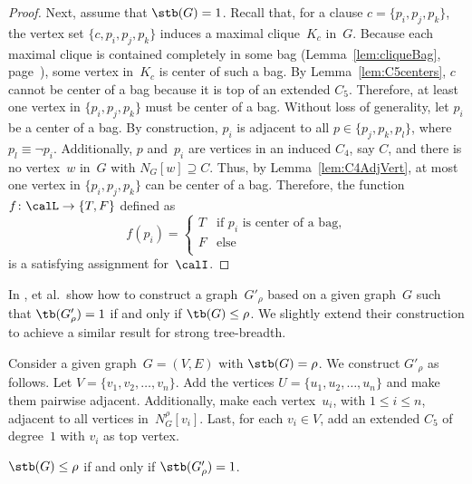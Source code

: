 \begin{proof}
Next, assume that $\stb(G) = 1$.
Recall that, for a clause $c = \{ p_i, p_j, p_k \}$, the vertex set $\{ c, p_i, p_j, p_k \}$ induces a maximal clique~$K_c$ in~$G$.
Because each maximal clique is contained completely in some bag (Lemma~\ref{lem:cliqueBag}, page~\pageref{lem:cliqueBag}), some vertex in~$K_c$ is center of such a bag.
By Lemma~\ref{lem:C5centers}, $c$ cannot be center of a bag because it is top of an extended $C_5$.
Therefore, at least one vertex in $\{ p_i, p_j, p_k \}$ must be center of a bag.
Without loss of generality, let $p_i$ be a center of a bag.
By construction, $p_i$ is adjacent to all $p \in \{ p_j, p_k, p_l \}$, where $p_l \equiv \neg p_i$.
Additionally, $p$ and~$p_i$ are vertices in an induced $C_4$, say $C$, and there is no vertex~$w$ in~$G$ with $N_G[w] \supseteq C$.
Thus, by Lemma~\ref{lem:C4AdjVert}, at most one vertex in $\{ p_i, p_j, p_k \}$ can be center of a bag.
Therefore, the function $f \colon \calL \rightarrow \{ T, F \}$ defined as
\[
    f(p_i) =
        \begin{cases}
            T & \text{if $p_i$ is center of a bag,} \\
            F & \text{else} \\
        \end{cases}
\]
is a satisfying assignment for~$\calI$.
\end{proof}

In \cite{DucoLegaNiss2016},  et al.\ show how to construct a graph~$G'_\rho$ based on a given graph~$G$ such that $\tb(G'_\rho) = 1$ if and only if $\tb(G) \leq \rho$.
We slightly extend their construction to achieve a similar result for strong tree-breadth.

Consider a given graph~$G = (V, E)$ with $\stb(G) = \rho$.
We construct $G'_\rho$ as follows.
Let $V = \{ v_1, v_2, \ldots, v_n \}$.
Add the vertices $U = \{ u_1, u_2, \ldots, u_n \}$ and make them pairwise adjacent.
Additionally, make each vertex~$u_i$, with $1 \leq i \leq n$, adjacent to all vertices in~$N_G^\rho[v_i]$.
Last, for each $v_i \in V$, add an extended $C_5$ of degree~$1$ with $v_i$ as top vertex.

\begin{lemma}
    \label{lem:Gprime}
\( \stb(G) \leq \rho \) if and only if \( \stb(G'_\rho) = 1 \).
\end{lemma}


